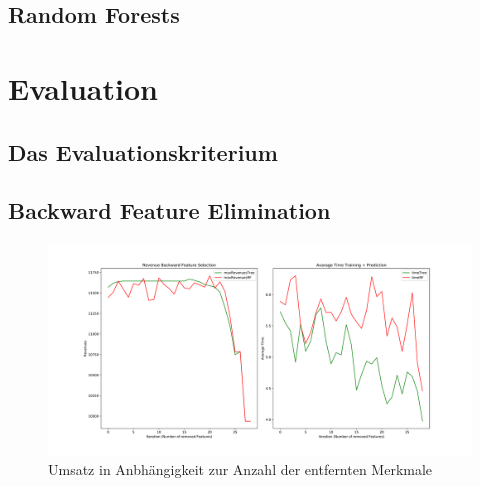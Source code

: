 \subsection{Random Forests}
\label{sec:RF}

 

\section{Evaluation}
\label{sec:eval}
\subsection{Das Evaluationskriterium}



\subsection{Backward Feature Elimination}

\FloatBarrier
\begin{figure}[!htbp]
\begin{center}
\includegraphics[scale=0.3]{pdf/backwardSpark.pdf}
\end{center}
\caption{Umsatz in Anbhängigkeit zur Anzahl der entfernten Merkmale}
\label{fig:backwardSpark}
\end{figure}
\FloatBarrier

